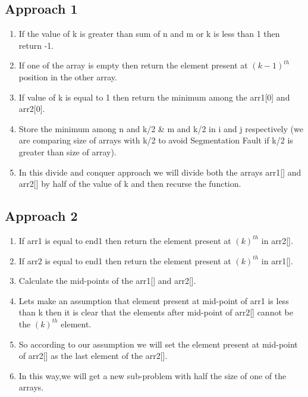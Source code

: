 \documentclass[conference]{IEEEtran}
\begin{document}
\subsection{ \textbf{Approach 1}}
\begin{enumerate}
\item  If  the value of k is greater than sum of n and m or k is less than 1 then return -1. 
\item  If one of the array is empty then return the element present at $\displaystyle{\left({k}-{1}\right)}^{{{t}{h}}}$ position in the other array.
\item If value of k is equal to 1 then return the minimum among the arr1[0] and arr2[0].
\item Store the minimum among n and k/2  \& m and k/2 in i and j respectively (we are comparing size of arrays with k/2 to avoid Segmentation Fault if k/2 is greater than size of array).
\item In this divide and conquer approach we will divide both the arrays arr1[] and arr2[] by half of the value of k and then recurse the function.
\end{enumerate}

\subsection{ \textbf{Approach 2}}
\begin{enumerate}
\item  If  arr1 is equal to end1 then return the element present at $\displaystyle{\left({k}\right)}^{{{t}{h}}}$ in arr2[].
\item If  arr2 is equal to end1 then return the element present at $\displaystyle{\left({k}\right)}^{{{t}{h}}}$  in arr1[].
\item Calculate the mid-points of the arr1[] and arr2[]. 
\item Lets make an assumption that element present at mid-point of arr1 is less than k then it is clear that the elements after mid-point of arr2[] cannot be the  $\displaystyle{\left({k}\right)}^{{{t}{h}}}$ element.
\item So according to our assumption we will set the element present at mid-point of arr2[] as the last element of the arr2[].
\item In this way,we will get a new sub-problem with half the size of one of the arrays.
\end{enumerate}
\end{document}
